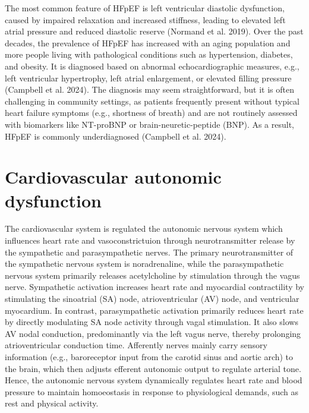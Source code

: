 \documentclass[
  a4paper,
  headsepline=true,
  open=any]{scrbook}
\begin{document}
The most common feature of HFpEF is left ventricular diastolic
dysfunction, caused by impaired relaxation and increased stiffness,
leading to elevated left atrial pressure and reduced diastolic reserve
(Normand et al. 2019). Over the past decades, the prevalence of HFpEF
has increased with an aging population and more people living with
pathological conditions such as hypertension, diabetes, and obesity. It
is diagnosed based on abnormal echocardiographic measures, e.g., left
ventricular hypertrophy, left atrial enlargement, or elevated filling
pressure (Campbell et al. 2024). The diagnosis may seem straightforward,
but it is often challenging in community settings, as patients
frequently present without typical heart failure symptoms (e.g.,
shortness of breath) and are not routinely assessed with biomarkers like
NT-proBNP or brain-neuretic-peptide (BNP). As a result, HFpEF is
commonly underdiagnosed (Campbell et al. 2024).


\hypertarget{cardiovascular-autonomic-dysfunction}{%
\chapter{Cardiovascular autonomic
dysfunction}\label{cardiovascular-autonomic-dysfunction}}

The cardiovascular system is regulated the autonomic nervous system
which influences heart rate and vasoconstrictuion through
neurotransmitter release by the sympathetic and parasympathetic nerves.
The primary neurotransmitter of the sympathetic nervous system is
noradrenaline, while the parasympathetic nervous system primarily
releases acetylcholine by stimulation through the vagus nerve.
Sympathetic activation increases heart rate and myocardial contractility
by stimulating the sinoatrial (SA) node, atrioventricular (AV) node, and
ventricular myocardium. In contrast, parasympathetic activation
primarily reduces heart rate by directly modulating SA node activity
through vagal stimulation. It also slows AV nodal conduction,
predominantly via the left vagus nerve, thereby prolonging
atrioventricular conduction time. Afferently nerves mainly carry sensory
information (e.g., baroreceptor input from the carotid sinus and aortic
arch) to the brain, which then adjusts efferent autonomic output to
regulate arterial tone. Hence, the autonomic nervous system dynamically
regulates heart rate and blood pressure to maintain homoeostasis in
response to physiological demands, such as rest and physical activity.
\end{document}
